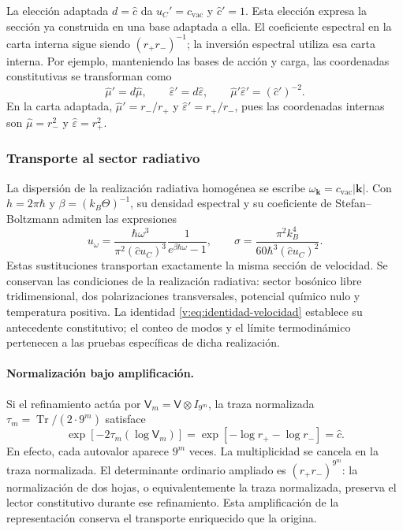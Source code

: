 La elección adaptada $d=\widehat c$ da $u_C'=c_{\mathrm{vac}}$ y
$\widehat c'=1$. Esta elección expresa la sección ya construida en una
base adaptada a ella. El coeficiente espectral en la carta interna sigue
siendo $(r_+r_-)^{-1}$; la inversión espectral utiliza esa carta interna.
Por ejemplo, manteniendo las bases de acción y carga, las coordenadas
constitutivas se transforman como
\[
 \widehat\mu'=d\widehat\mu,
 \qquad \widehat\varepsilon'=d\widehat\varepsilon,
 \qquad
 \widehat\mu'\widehat\varepsilon'=(\widehat c')^{-2}.
\]
En la carta adaptada, $\widehat\mu'=r_-/r_+$ y
$\widehat\varepsilon'=r_+/r_-$, pues las coordenadas internas son
$\widehat\mu=r_-^2$ y $\widehat\varepsilon=r_+^2$.

\subsubsection{Transporte al sector radiativo}

La dispersión de la realización radiativa homogénea se escribe
$\omega_{\boldsymbol k}=c_{\mathrm{vac}}|\boldsymbol k|$.
Con $h=2\pi\hbar$ y $\beta=(k_B\Theta)^{-1}$, su densidad espectral
y su coeficiente de Stefan--Boltzmann admiten las expresiones
\begin{equation}
 u_\omega=
 \frac{\hbar\omega^3}{\pi^2(\widehat c u_C)^3}
 \frac{1}{e^{\beta\hbar\omega}-1},
 \qquad
 \sigma=\frac{\pi^2k_B^4}{60\hbar^3(\widehat c u_C)^2}.
 \label{v:eq:radiacion-velocidad-constitutiva}
\end{equation}
Estas sustituciones transportan exactamente la misma sección de
velocidad. Se conservan las condiciones de la realización radiativa:
sector bosónico libre tridimensional, dos polarizaciones transversales,
potencial químico nulo y temperatura positiva. La identidad
\eqref{v:eq:identidad-velocidad} establece su antecedente constitutivo;
el conteo de modos y el límite termodinámico pertenecen a las pruebas
específicas de dicha realización.

\paragraph{Normalización bajo amplificación.}
Si el refinamiento actúa por $\mathsf V_m=\mathsf V\otimes I_{9^m}$,
la traza normalizada $\tau_m=\operatorname{Tr}/(2\cdot9^m)$ satisface
\[
 \exp[-2\tau_m(\log\mathsf V_m)]
 =\exp[-\log r_+-\log r_-]=\widehat c.
\]
En efecto, cada autovalor aparece $9^m$ veces. La multiplicidad se
cancela en la traza normalizada. El determinante ordinario ampliado es
$(r_+r_-)^{9^m}$: la normalización de dos hojas, o equivalentemente la
traza normalizada, preserva el lector constitutivo durante ese
refinamiento. Esta amplificación de la representación conserva el
transporte enriquecido que la origina.
